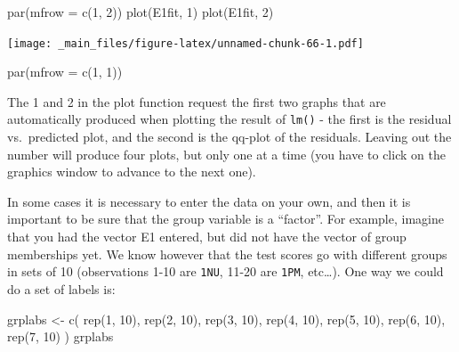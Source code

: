 \documentclass[
]{book}
\newenvironment{Shaded}{\begin{snugshade}}{\end{snugshade}}
\newcommand{\AttributeTok}[1]{\textcolor[rgb]{0.77,0.63,0.00}{#1}}
\newcommand{\DecValTok}[1]{\textcolor[rgb]{0.00,0.00,0.81}{#1}}
\newcommand{\FunctionTok}[1]{\textcolor[rgb]{0.00,0.00,0.00}{#1}}
\newcommand{\NormalTok}[1]{#1}
\newcommand{\OtherTok}[1]{\textcolor[rgb]{0.56,0.35,0.01}{#1}}
\begin{document}
\begin{Shaded}
\begin{Highlighting}[]
\FunctionTok{par}\NormalTok{(}\AttributeTok{mfrow =} \FunctionTok{c}\NormalTok{(}\DecValTok{1}\NormalTok{, }\DecValTok{2}\NormalTok{))}
\FunctionTok{plot}\NormalTok{(E1fit, }\DecValTok{1}\NormalTok{)}
\FunctionTok{plot}\NormalTok{(E1fit, }\DecValTok{2}\NormalTok{)}
\end{Highlighting}
\end{Shaded}

\texttt{[image: \_main\_files/figure-latex/unnamed-chunk-66-1.pdf]}

\begin{Shaded}
\begin{Highlighting}[]
\FunctionTok{par}\NormalTok{(}\AttributeTok{mfrow =} \FunctionTok{c}\NormalTok{(}\DecValTok{1}\NormalTok{, }\DecValTok{1}\NormalTok{))}
\end{Highlighting}
\end{Shaded}

The 1 and 2 in the plot function request the first two graphs that are automatically produced when plotting the result of \texttt{lm()} - the first is the residual vs.~predicted plot, and the second is the qq-plot of the residuals. Leaving out the number will produce four plots, but only one at a time (you have to click on the graphics window to advance to the next one).

In some cases it is necessary to enter the data on your own, and then it is important to be sure that the group variable is a ``factor''. For example, imagine that you had the vector E1 entered, but did not have the vector of group memberships yet. We know however that the test scores go with different groups in sets of 10 (observations 1-10 are \texttt{1NU}, 11-20 are \texttt{1PM}, etc\ldots). One way we could do a set of labels is:

\begin{Shaded}
\begin{Highlighting}[]
\NormalTok{grplabs }\OtherTok{\textless{}{-}} \FunctionTok{c}\NormalTok{(}
  \FunctionTok{rep}\NormalTok{(}\DecValTok{1}\NormalTok{, }\DecValTok{10}\NormalTok{), }\FunctionTok{rep}\NormalTok{(}\DecValTok{2}\NormalTok{, }\DecValTok{10}\NormalTok{), }\FunctionTok{rep}\NormalTok{(}\DecValTok{3}\NormalTok{, }\DecValTok{10}\NormalTok{),}
  \FunctionTok{rep}\NormalTok{(}\DecValTok{4}\NormalTok{, }\DecValTok{10}\NormalTok{), }\FunctionTok{rep}\NormalTok{(}\DecValTok{5}\NormalTok{, }\DecValTok{10}\NormalTok{), }\FunctionTok{rep}\NormalTok{(}\DecValTok{6}\NormalTok{, }\DecValTok{10}\NormalTok{), }\FunctionTok{rep}\NormalTok{(}\DecValTok{7}\NormalTok{, }\DecValTok{10}\NormalTok{)}
\NormalTok{)}
\NormalTok{grplabs}
\end{Highlighting}
\end{Shaded}
\end{document}
